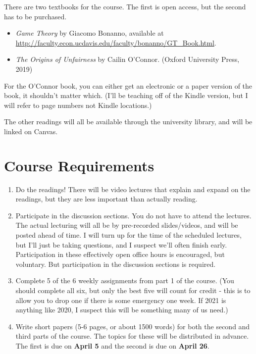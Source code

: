 \documentclass[
]{article}
\providecommand{\tightlist}{%
  \setlength{\itemsep}{0pt}\setlength{\parskip}{0pt}}
\begin{document}
There are two textbooks for the course. The first is open access, but
the second has to be purchased.

\begin{itemize}
\tightlist
\item
  \emph{Game Theory} by Giacomo Bonanno, available at
  \url{http://faculty.econ.ucdavis.edu/faculty/bonanno/GT_Book.html}.
\item
  \emph{The Origins of Unfairness} by Cailin O'Connor. (Oxford
  University Press, 2019)
\end{itemize}

For the O'Connor book, you can either get an electronic or a paper
version of the book, it shouldn't matter which. (I'll be teaching off of
the Kindle version, but I will refer to page numbers not Kindle
locations.)

The other readings will all be available through the university library,
and will be linked on Canvas.

\hypertarget{course-requirements}{%
\section{Course Requirements}\label{course-requirements}}

\begin{enumerate}
\def\labelenumi{\arabic{enumi}.}
\tightlist
\item
  Do the readings! There will be video lectures that explain and expand
  on the readings, but they are less important than actually reading.
\item
  Participate in the discussion sections. You do not have to attend the
  lectures. The actual lecturing will all be by pre-recorded
  slides/videos, and will be posted ahead of time. I will turn up for
  the time of the scheduled lectures, but I'll just be taking questions,
  and I suspect we'll often finish early. Participation in these
  effectively open office hours is encouraged, but voluntary. But
  participation in the discussion sections is required.
\item
  Complete 5 of the 6 weekly assignments from part 1 of the course. (You
  should complete all six, but only the best five will count for credit
  - this is to allow you to drop one if there is some emergency one
  week. If 2021 is anything like 2020, I suspect this will be something
  many of us need.)
\item
  Write short papers (5-6 pages, or about 1500 words) for both the
  second and third parts of the course. The topics for these will be
  distributed in advance. The first is due on \textbf{April 5} and the
  second is due on \textbf{April 26}.
\end{enumerate}
\end{document}
